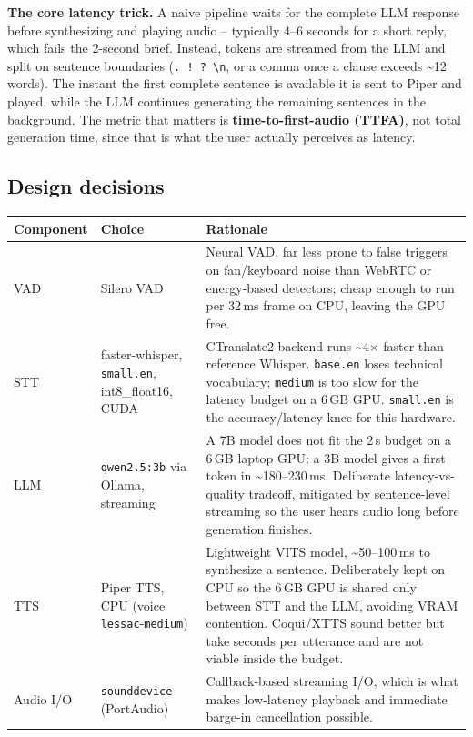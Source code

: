 \documentclass[11pt]{article}
\begin{document}
\noindent\textbf{The core latency trick.} A naive pipeline waits for the complete LLM response
before synthesizing and playing audio -- typically 4--6 seconds for a short reply, which fails
the 2-second brief. Instead, tokens are streamed from the LLM and split on sentence boundaries
(\texttt{.\ ! ? \textbackslash n}, or a comma once a clause exceeds \textasciitilde12 words).
The instant the first complete sentence is available it is sent to Piper and played, while the
LLM continues generating the remaining sentences in the background. The metric that matters is
\textbf{time-to-first-audio (TTFA)}, not total generation time, since that is what the user
actually perceives as latency.

\subsection*{Design decisions}
\begin{center}
\begin{longtable}{@{}p{2.1cm}p{3.1cm}p{8.3cm}@{}}
\toprule
\textbf{Component} & \textbf{Choice} & \textbf{Rationale} \\
\midrule
VAD & Silero VAD & Neural VAD, far less prone to false triggers on fan/keyboard noise than
WebRTC or energy-based detectors; cheap enough to run per 32\,ms frame on CPU, leaving the
GPU free. \\
STT & faster-whisper, \texttt{small.en}, int8\_float16, CUDA & CTranslate2 backend runs
\textasciitilde4$\times$ faster than reference Whisper. \texttt{base.en} loses technical
vocabulary; \texttt{medium} is too slow for the latency budget on a 6\,GB GPU.
\texttt{small.en} is the accuracy/latency knee for this hardware. \\
LLM & \texttt{qwen2.5:3b} via Ollama, streaming & A 7B model does not fit the 2\,s budget on
a 6\,GB laptop GPU; a 3B model gives a first token in \textasciitilde180--230\,ms. Deliberate
latency-vs-quality tradeoff, mitigated by sentence-level streaming so the user hears audio
long before generation finishes. \\
TTS & Piper TTS, CPU (voice \texttt{lessac}\--\texttt{medium}) & Lightweight VITS model, \textasciitilde50--100\,ms to synthesize a sentence. Deliberately kept on CPU so the 6\,GB GPU is shared only
between STT and the LLM, avoiding VRAM contention. Coqui/XTTS sound better but take seconds
per utterance and are not viable inside the budget. \\
Audio I/O & \texttt{sounddevice} (PortAudio) & Callback-based streaming I/O, which is what
makes low-latency playback and immediate barge-in cancellation possible. \\
\bottomrule
\end{longtable}
\end{center}
\end{document}

